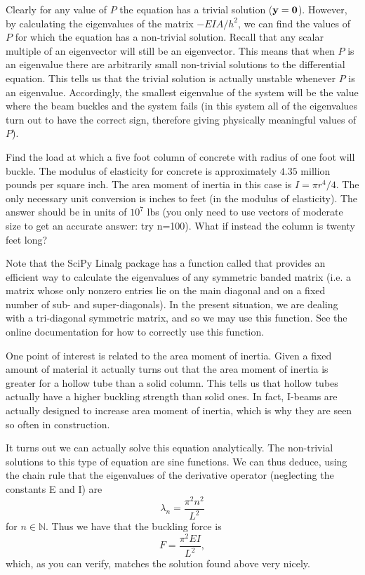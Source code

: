 Clearly for any value of $P$ the equation has a trivial solution ($\bf{y}=0$). However, by calculating the eigenvalues of the matrix $-EIA/h^2$, we can find the values of $P$ for which the equation has a non-trivial solution. Recall that any scalar multiple of an eigenvector will still be an eigenvector. This means that when $P$ is an eigenvalue there are arbitrarily small non-trivial solutions to the differential equation. This tells us that the trivial solution is actually unstable whenever $P$ is an eigenvalue. Accordingly, the smallest eigenvalue of the system will be the value where the beam buckles and the system fails (in this system all of the eigenvalues turn out to have the correct sign, therefore giving physically meaningful values of $P$).

\begin{problem}
Find the load at which a five foot column of concrete with radius of one foot will buckle. The modulus of elasticity for concrete is approximately $4.35$ million pounds per square inch. The area moment of inertia in this case is $I = \pi r^4/4$. The only necessary unit conversion is inches to feet (in the modulus of elasticity). The answer should be in units of $10^7$ lbs (you only need to use vectors of moderate size to get an accurate answer: try n=100). What if instead the column is twenty feet long?

Note that the SciPy Linalg package has a function called  that provides an efficient
way to calculate the eigenvalues of any symmetric banded matrix (i.e. a matrix whose only nonzero entries 
lie on the main diagonal and on a fixed number of sub- and super-diagonals). In the present situation,
we are dealing with a tri-diagonal symmetric matrix, and so we may use this function. See the online
documentation for how to correctly use this function.
\end{problem}

One point of interest is related to the area moment of inertia. Given a fixed amount of material it actually turns out that the area moment of inertia is greater for a hollow tube than a solid column. This tells us that hollow tubes actually have a higher buckling strength than solid ones. In fact, I-beams are actually designed to increase area moment of inertia, which is why they are seen so often in construction.

It turns out we can actually solve this equation analytically. The non-trivial solutions to this type of equation are sine functions. We can thus deduce, using the chain rule that the eigenvalues of the derivative operator (neglecting the constants E and I) are
\[
\lambda_n = \frac{\pi^2 n^2}{L^2}
\]
for $n \in \mathbb{N}$. Thus we have that the buckling force is
\[
F = \frac{\pi^2 EI}{L^2},
\]
which, as you can verify, matches the solution found above very nicely.

